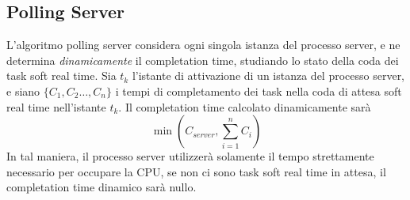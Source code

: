 \documentclass[10pt, letterpaper]{report}
\begin{document}
\subsection{Polling Server}
L'algoritmo polling server considera ogni singola istanza del processo server, e ne determina \textit{dinamicamente} il completation time, studiando lo stato della coda dei task soft real time.\acc 
Sia $t_k$ l'istante di attivazione di un istanza del processo server, e siano $\{C_1,C_2\dots , C_n\}$ i tempi di completamento dei task nella coda di attesa soft real time nell'istante $t_k$. Il completation time calcolato dinamicamente sarà 
$$ \min(C_{server}, \sum_{i=1}^n C_i)$$
In tal maniera, il processo server utilizzerà solamente il tempo strettamente necessario per occupare la CPU, se non ci sono task soft real time in attesa, il completation time dinamico sarà nullo.
\end{document}
